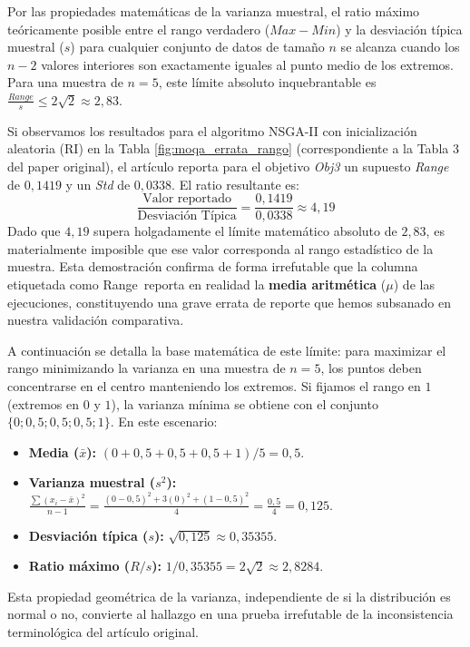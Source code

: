 \documentclass[a4paper,10pt]{article} %
\begin{document}
\begin{itemize}
    Por las propiedades matemáticas de la varianza muestral, el ratio máximo teóricamente posible entre el rango verdadero ($Max - Min$) y la desviación típica muestral ($s$) para cualquier conjunto de datos de tamaño $n$ se alcanza cuando los $n-2$ valores interiores son exactamente iguales al punto medio de los extremos. Para una muestra de $n=5$, este límite absoluto inquebrantable es $\frac{Range}{s} \le 2\sqrt{2} \approx 2,83$.
    
    Si observamos los resultados para el algoritmo NSGA-II con inicialización aleatoria (RI) en la Tabla \ref{fig:moqa_errata_rango} (correspondiente a la Tabla 3 del paper original), el artículo reporta para el objetivo \textit{Obj3} un supuesto \textit{Range} de $0,1419$ y un \textit{Std} de $0,0338$. El ratio resultante es:
    $$ \frac{\text{Valor reportado}}{\text{Desviación Típica}} = \frac{0,1419}{0,0338} \approx 4,19 $$
    Dado que $4,19$ supera holgadamente el límite matemático absoluto de $2,83$, es materialmente imposible que ese valor corresponda al rango estadístico de la muestra. Esta demostración confirma de forma irrefutable que la columna etiquetada como \guillemotleft Range\guillemotright\ reporta en realidad la \textbf{media aritmética} ($\mu$) de las ejecuciones, constituyendo una grave errata de reporte que hemos subsanado en nuestra validación comparativa.
    
    A continuación se detalla la base matemática de este límite: para maximizar el rango minimizando la varianza en una muestra de $n=5$, los puntos deben concentrarse en el centro manteniendo los extremos. Si fijamos el rango en $1$ (extremos en $0$ y $1$), la varianza mínima se obtiene con el conjunto $\{0; 0,5; 0,5; 0,5; 1\}$. En este escenario:
    \begin{itemize}
        \item \textbf{Media ($\bar{x}$):} $(0 + 0,5 + 0,5 + 0,5 + 1) / 5 = 0,5$.
        \item \textbf{Varianza muestral ($s^2$):} $\frac{\sum (x_i - \bar{x})^2}{n-1} = \frac{(0-0,5)^2 + 3(0)^2 + (1-0,5)^2}{4} = \frac{0,5}{4} = 0,125$.
        \item \textbf{Desviación típica ($s$):} $\sqrt{0,125} \approx 0,35355$.
        \item \textbf{Ratio máximo ($R/s$):} $1 / 0,35355 = 2\sqrt{2} \approx 2,8284$.
    \end{itemize}
    Esta propiedad geométrica de la varianza, independiente de si la distribución es normal o no, convierte al hallazgo en una prueba irrefutable de la inconsistencia terminológica del artículo original.
    
\end{itemize}
\end{document}
